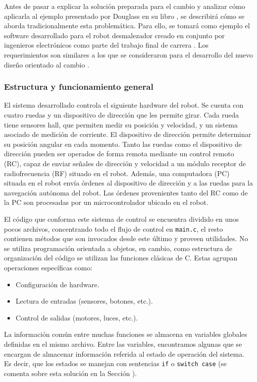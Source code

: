 Antes de pasar a explicar la solución preparada para el cambio y analizar cómo aplicarla al ejemplo presentado por Douglass en su libro \cite{douglass}, se describirá cómo se aborda tradicionalmente esta problemática. Para ello, se tomará como ejemplo el software desarrollado para el robot desmalezador creado en conjunto por ingenieros electrónicos como parte del trabajo final de carrera \cite{disenioViejo1, disenioViejo2}. Los requerimientos son similares a los que se consideraron para el desarrollo del nuevo diseño orientado al cambio \cite{paperPomponio}.

\subsubsection*{Estructura y funcionamiento general}

El sistema desarrollado controla el siguiente hardware del robot. Se cuenta con cuatro ruedas y un dispositivo de dirección que les permite girar. Cada rueda tiene sensores \gls{hall}, que permiten medir su posición y velocidad, y un sistema asociado de medición de corriente. El dispositivo de dirección permite determinar su posición angular en cada momento. Tanto las ruedas como el dispositivo de dirección pueden ser operados de forma remota mediante un control remoto (RC), capaz de enviar señales de dirección y velocidad a un módulo receptor de radiofrecuencia (RF) situado en el robot. Además, una computadora (PC) situada en el robot envía órdenes al dispositivo de dirección y a las ruedas para la navegación autónoma del robot. Las órdenes provenientes tanto del RC como de la PC son procesadas por un microcontrolador ubicado en el robot.

El código que conforma este sistema de control se encuentra dividido en unos pocos archivos, concentrando todo el flujo de control en \verb|main.c|, el resto contienen métodos que son invocados desde este último y proveen utilidades. No se utiliza programación orientada a objetos, en cambio, como estructura de organización del código se utilizan las funciones clásicas de C. Estas agrupan operaciones específicas como:
\begin{itemize}
\item Configuración de hardware.
\item Lectura de entradas (sensores, botones, etc.).
\item Control de salidas (motores, luces, etc.).
\end{itemize}

La información común entre muchas funciones se almacena en variables globales definidas en el mismo archivo. Entre las variables, encontramos algunas que se encargan de almacenar información referida al estado de operación del sistema. Es decir, que los estados se manejan con sentencias \verb|if| o \verb|switch case| (se comenta sobre esta solución en la Sección ).

